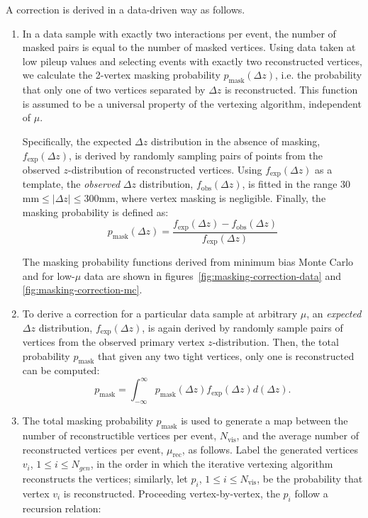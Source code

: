 A correction is derived in a data-driven way as follows. 
\begin{enumerate}
	\item In a data sample with exactly two interactions per event, the number of masked pairs is equal to the number of masked vertices. Using data taken at low pileup values and selecting events with exactly two reconstructed vertices, we calculate the 2-vertex masking probability $p_{\textrm{mask}}(\Delta z)$, i.e. the probability that only one of two vertices separated by $\Delta z$ is reconstructed. This function is assumed to be a universal property of the vertexing algorithm, independent of $\mu$. 
	
	Specifically, the expected $\Delta z$ distribution in the absence of masking, $f_{\mathrm{exp}}(\Delta z)$, is derived by randomly sampling pairs of points from the observed $z$-distribution of reconstructed vertices. Using $f_{\mathrm{exp}}(\Delta z)$ as a template, the \emph{observed} $\Delta z$ distribution, $f_{\mathrm{obs}}(\Delta z)$, is fitted in the range $30$mm$\leq| \Delta z| \leq 300$mm, where vertex masking is negligible. Finally, the masking probability is defined as:
	\begin{equation}
		p_{\textrm{mask}}(\Delta z) = \frac{f_{\mathrm{exp}}(\Delta z) - f_{\mathrm{obs}}(\Delta z)}{f_{\mathrm{exp}}(\Delta z)}
	\end{equation}
	
	The masking probability functions derived from minimum bias Monte Carlo and for low-$\mu$ data are shown in figures~\ref{fig:masking-correction-data} and \ref{fig:masking-correction-mc}.
		
	\item To derive a correction for a particular data sample at arbitrary $\mu$, an \emph{expected} $\Delta z$ distribution, $f_{\mathrm{exp}}(\Delta z)$, is again derived by randomly sample pairs of vertices from the observed primary vertex $z$-distribution. Then, the total probability $p_{\textrm{mask}}$ that given any two tight vertices, only one is reconstructed can be computed: 
	\begin{equation}
		p_{\textrm{mask}} = \int_{-\infty}^{\infty} p_{\textrm{mask}}(\Delta z) f_{\mathrm{exp}}(\Delta z) d(\Delta z).
	\end{equation}
	
	\item The total masking probability $p_{\textrm{mask}}$ is used to generate a map between the number of reconstructible vertices per event, $N_{\textrm{vis}}$, and the average number of reconstructed vertices per event, $\mu_{\textrm{rec}}$, as follows. Label the generated vertices $v_i$, $1 \leq i \leq N_{gen}$, in the order in which the iterative vertexing algorithm reconstructs the vertices; similarly, let $p_i$, $1\leq i \leq N_{\textrm{vis}}$, be the probability that vertex $v_i$ is reconstructed. Proceeding vertex-by-vertex, the $p_i$ follow a recursion relation:


\end{enumerate}

